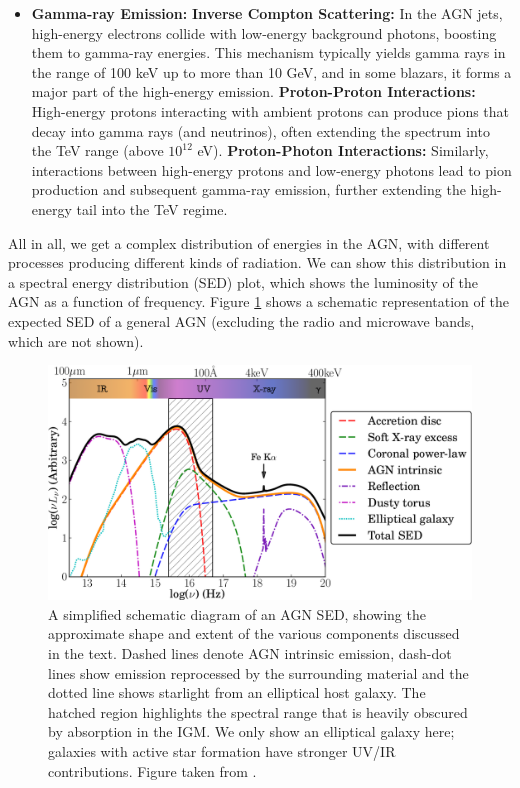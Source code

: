 \begin{itemize}
    \item \textbf{Gamma-ray Emission:}
    \subitem \textbf{Inverse Compton Scattering:} In the AGN jets, high-energy electrons collide with low-energy background photons, boosting them to gamma-ray energies. This mechanism typically yields gamma rays in the range of 100 keV up to more than 10 GeV, and in some blazars, it forms a major part of the high-energy emission.
    \subitem \textbf{Proton-Proton Interactions:} High-energy protons interacting with ambient protons can produce pions that decay into gamma rays (and neutrinos), often extending the spectrum into the TeV range (above $10^{12}$ eV). 
    \subitem \textbf{Proton-Photon Interactions:} Similarly, interactions between high-energy protons and low-energy photons lead to pion production and subsequent gamma-ray emission, further extending the high-energy tail into the TeV regime.
\end{itemize}


All in all, we get a complex distribution of energies in the AGN, with different processes producing different kinds of radiation. We can show this distribution in a spectral energy distribution (SED) plot, which shows the luminosity of the AGN as a function of frequency. Figure \ref{fig:AGN_SED} shows a schematic representation of the expected SED of a general AGN (excluding the radio and microwave bands, which are not shown).

\begin{figure}[h]
    \centering
    \includegraphics[width=\textwidth]{Figures/AGN SED.png}
    \caption{A simplified schematic diagram of an AGN SED, showing the approximate shape and extent of the various components discussed in the text. Dashed lines denote AGN intrinsic emission, dash-dot lines show emission reprocessed by the surrounding material and the dotted line shows starlight from an elliptical host galaxy. The hatched region highlights the spectral range that is heavily obscured by absorption in the IGM. We only show an elliptical galaxy here; galaxies with active star formation have stronger UV/IR contributions. Figure taken from \citet{QuasarSEDCollinson_2016}.}
    \label{fig:AGN_SED}
\end{figure}

